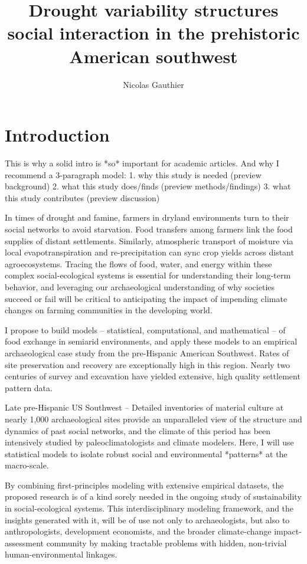 \documentclass[fleqn,10pt]{wlscirep}
\title{Drought variability structures social interaction in the prehistoric American southwest}
\author[1,*]{Nicolas Gauthier}
\affil[1]{School of Human Evolution and Social Change, 900 S Caddy Mall, Tempe, USA}
\affil[*]{Nicolas.Gauthier@asu.edu}
\begin{document}
\flushbottom
\maketitle


\thispagestyle{empty}


\section*{Introduction}

This is why a solid intro is *so* important for academic articles. And why I recommend a 3-paragraph model:
1. why this study is needed (preview background)
2. what this study does/finds (preview methods/findings)
3. what this study contributes (preview discussion)

In times of drought and famine, farmers in dryland environments turn to their social networks to avoid starvation. Food transfers among farmers link the food supplies of distant settlements. Similarly, atmospheric transport of moisture via local evapotranspiration and re-precipitation can sync crop yields across distant agroecosystems. Tracing the flows of food, water, and energy within these complex social-ecological systems is essential for understanding their long-term behavior, and leveraging our archaeological understanding of why societies succeed or fail will be critical to anticipating the impact of impending climate changes on farming communities in the developing world.

I propose to build models -- statistical, computational, and mathematical -- of food exchange in semiarid environments, and apply these models to an empirical archaeological case study from the pre-Hispanic American Southwest. Rates of site preservation and recovery are exceptionally high in this region. Nearly two centuries of survey and excavation have yielded extensive, high quality settlement pattern data.


   Late pre-Hispanic US Southwest -- Detailed inventories of material culture at nearly 1,000 archaeological sites provide an unparalleled view of the structure and dynamics of past social networks, and the climate of this period has been intensively studied by paleoclimatologists and climate modelers. Here, I will use statistical models to isolate robust social and environmental *patterns* at the macro-scale.


By combining first-principles modeling with extensive empirical datasets, the proposed research is of a kind sorely needed in the ongoing study of sustainability in social-ecological systems. This interdisciplinary modeling framework, and the insights generated with it, will be of use not only to archaeologists, but also to anthropologists, development economists, and the broader climate-change impact-assessment community by making tractable problems with hidden, non-trivial human-environmental linkages.
\end{document}
